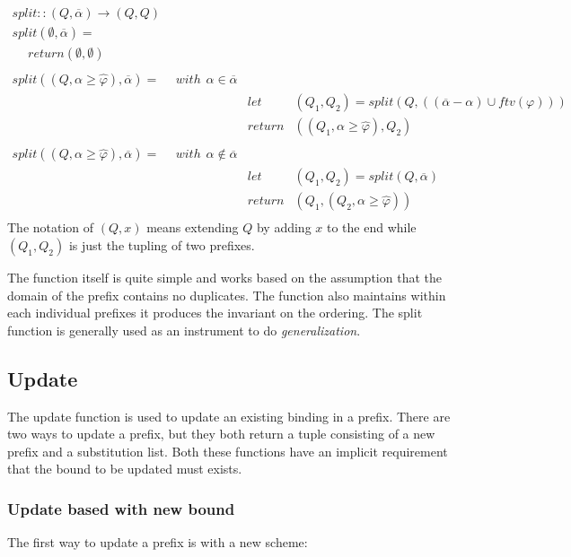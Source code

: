\begin{eqnarray*}
split :: (Q, \overline{\alpha}) \rightarrow (Q,Q) \\
split(\emptyset, \overline{\alpha}) = \\
\hspace{15pt} return (\emptyset, \emptyset) \\
\\
split((Q,\alpha \geq \hat{\varphi}),\overline{\alpha}) = \hspace{15pt} with \hspace{5pt} \alpha \in \overline{\alpha} \\
\hspace{15pt} &let & (Q_1, Q_2) = split(Q,((\overline{\alpha} - \alpha)\cup ftv(\varphi))) \\
              &return & ((Q_1, \alpha \geq \hat{\varphi}), Q_2) \\
\\
split((Q,\alpha \geq \hat{\varphi}),\overline{\alpha}) = \hspace{15pt} with \hspace{5pt} \alpha \notin \overline{\alpha} \\
\hspace{15pt} &let & (Q_1, Q_2) = split(Q,\overline{\alpha}) \\
              &return & (Q_1, (Q_2, \alpha \geq \hat{\varphi})) \\
\end{eqnarray*}
The notation of $(Q,x)$ means extending $Q$ by adding $x$ to the end while $(Q_1, Q_2)$ is just the tupling of two prefixes.

The function itself is quite simple and works based on the assumption that the domain of the prefix contains no duplicates. The function also maintains within each individual prefixes it produces the invariant on the ordering. The split function is generally used as an instrument to do \emph{generalization}.
\subsection{Update}
The update function is used to update an existing binding in a prefix. There are two ways to update a prefix, but they both return a tuple consisting of a new prefix and a substitution list. Both these functions have an implicit requirement that the bound to be updated must exists.
\subsubsection{Update based with new bound}
The first way to update a prefix is with a new scheme:

